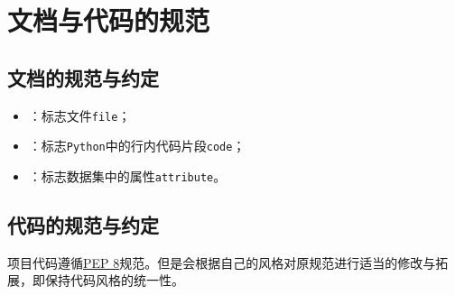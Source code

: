 \setcounter{section}{-1}

\section{文档与代码的规范}
\subsection{文档的规范与约定}
\begin{itemize}
	\item {}：标志文件\texttt{file}；
	\item {}：标志\texttt{Python}中的行内代码片段\texttt{code}；
	\item {}：标志数据集中的属性\texttt{attribute}。
\end{itemize}

\subsection{代码的规范与约定}
项目代码遵循\href{https://www.python.org/dev/peps/pep-0008/}{PEP 8}规范。但是会根据自己的风格对原规范进行适当的修改与拓展，即保持代码风格的统一性。
